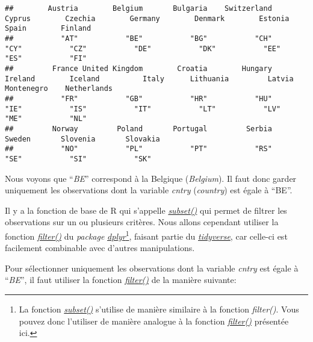 \documentclass[
]{book}
\newenvironment{Shaded}{\begin{snugshade}}{\end{snugshade}}
\newcommand{\FunctionTok}[1]{\textcolor[rgb]{0.00,0.00,0.00}{#1}}
\newcommand{\NormalTok}[1]{#1}
\newcommand{\SpecialCharTok}[1]{\textcolor[rgb]{0.00,0.00,0.00}{#1}}
\begin{document}
\begin{Shaded}
\end{Shaded}

\begin{verbatim}
##        Austria        Belgium       Bulgaria    Switzerland         Cyprus        Czechia        Germany        Denmark        Estonia          Spain        Finland 
##           "AT"           "BE"           "BG"           "CH"           "CY"           "CZ"           "DE"           "DK"           "EE"           "ES"           "FI" 
##         France United Kingdom        Croatia        Hungary        Ireland        Iceland          Italy      Lithuania         Latvia     Montenegro    Netherlands 
##           "FR"           "GB"           "HR"           "HU"           "IE"           "IS"           "IT"           "LT"           "LV"           "ME"           "NL" 
##         Norway         Poland       Portugal         Serbia         Sweden       Slovenia       Slovakia 
##           "NO"           "PL"           "PT"           "RS"           "SE"           "SI"           "SK"
\end{verbatim}

Nous voyons que ``\emph{BE}'' correspond à la Belgique (\emph{Belgium}). Il faut donc garder uniquement les observations dont la variable \emph{cntry} (\emph{country}) est égale à ``BE''.

Il y a la fonction de base de R qui s'appelle \href{https://www.rdocumentation.org/packages/base/versions/3.6.2/topics/subset}{\emph{subset()}} qui permet de filtrer les observations sur un ou plusieurs critères. Nous allons cependant utiliser la fonction \href{https://dplyr.tidyverse.org/reference/filter.html}{\emph{filter()}} du \emph{package} \href{https://dplyr.tidyverse.org/}{\emph{dplyr}}\footnote{La fonction \href{https://www.rdocumentation.org/packages/base/versions/3.6.2/topics/subset}{\emph{subset()}} s'utilise de manière similaire à la fonction \emph{filter()}. Vous pouvez donc l'utiliser de manière analogue à la fonction \href{https://dplyr.tidyverse.org/reference/filter.html}{\emph{filter()}} présentée ici.}, faisant partie du \href{https://www.tidyverse.org/}{\emph{tidyverse}}, car celle-ci est facilement combinable avec d'autres manipulations.

Pour sélectionner uniquement les observations dont la variable \emph{cntry} est égale à ``\emph{BE}'', il faut utiliser la fonction \href{https://dplyr.tidyverse.org/reference/filter.html}{\emph{filter()}} de la manière suivante:
\end{document}
